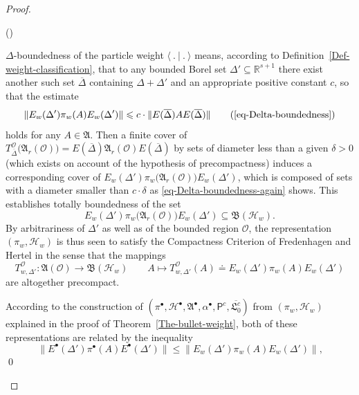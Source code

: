 \documentclass[11pt,twoside,openright]{report}
\theoremstyle{definition}
\theoremstyle{plain}
\theoremstyle{remark}
\theoremstyle{assumption}
\newcommand{\norm}[1]{\lVert #1 \rVert}
\newcommand{\scp}[2]{\langle #1 \vert #2 \rangle}
\newcommand{\Afrak}{\mathfrak{A}}
\newcommand{\Hscr}{\mathscr{H}}
\newcommand{\Oscr}{\mathscr{O}}
\newcommand{\Rsone}{\mathbb{R}^{s + 1}}
\newcommand{\Deltabar}{\overline{\Delta}}
\newcommand{\BHw}{\mathfrak{B} ( \mathscr{H}_w )}
\newcommand{\EDbar}{E ( \overline{\Delta} )}
\newcommand{\EbulletDeltaprime}{E^\bullet ( \Delta' )}
\newcommand{\EwDprime}{E_w ( \Delta' )}
\newcommand{\AO}{\mathfrak{A} ( \mathscr{O} )}
\newcommand{\ArO}{\mathfrak{A}_r ( \mathscr{O} )}
\newcommand{\Pcount}{\mathsf{P}^c}
\newcommand{\vaccountbar}{\overline{\mathfrak{L}_0^c}}
\newcommand{\Hbullet}{\mathscr{H}^\bullet}
\newcommand{\Abullet}{\mathfrak{A}^\bullet}
\newcommand{\TODbar}{T_{\overline{\Delta}}^\Oscr}
\newcommand{\TwODprime}{T_{w , \Delta'}^\Oscr}
\newcounter{proofitem}
\newenvironment{prooflist}{\begin{list}{(\roman{proofitem})}%
  {\usecounter{proofitem} \setlength{\topsep}{0ex}%
   \setlength{\parsep}{0.2ex} \setlength{\itemsep}{0.4ex}%
   \setlength{\leftmargin}{0em} \setlength{\itemindent}{0.5em}%
   \setlength{\listparindent}{1em}}}{\qed \end{list}}
\begin{document}
\begin{proof}
  \begin{prooflist}
  \item $\Delta$-boundedness of the particle weight $\scp{~.~}{~.~}$
    means, according to Definition~\ref{Def-weight-classification},
    that to any bounded Borel set $\Delta' \subseteq \Rsone$ there
    exist another such set $\Deltabar$ containing $\Delta + \Delta'$
    and an appropriate positive constant $c$, so that the estimate
    \begin{equation}
      \label{eq-Delta-boundedness-again}
      \norm{\EwDprime \pi_w ( A ) \EwDprime} \leqslant c \cdot
      \norm{\EDbar A \EDbar} \tag{\ref{eq-Delta-boundedness}}
    \end{equation}
    holds for any $A \in \Afrak$. Then a finite cover of $\TODbar
    \bigl( \ArO \bigr) = \EDbar \ArO \EDbar$ by sets of diameter less
    than a given $\delta > 0$ (which exists on account of the
    hypothesis of precompactness) induces a corresponding cover of
    $\EwDprime \pi_w \bigl( \ArO \bigr) \EwDprime$, which is composed
    of sets with a diameter smaller than $c \cdot \delta$ as
    \eqref{eq-Delta-boundedness-again} shows. This establishes totally
    boundedness of the set
    \begin{equation*}
      \EwDprime \pi_w \bigl( \ArO \bigr) \EwDprime \subseteq \BHw
      \text{.}
    \end{equation*}
    By arbitrariness of $\Delta'$ as well as of the bounded region
    $\Oscr$, the representation $( \pi_w , \Hscr_w )$ is thus seen to
    satisfy the Compactness Criterion of Fredenhagen and Hertel in the
    sense that the mappings
    \begin{equation*}
      \TwODprime : \AO \rightarrow \BHw \qquad A \mapsto \TwODprime (
      A ) \doteq \EwDprime \pi_w ( A ) \EwDprime
    \end{equation*}
    are altogether precompact.
  \item According to the construction of $( \pi^\bullet , \Hbullet ,
    \Abullet , \alpha^\bullet , \Pcount , \vaccountbar)$ from $( \pi_w
    , \Hscr_w )$ explained in the proof of
    Theorem~\ref{The-bullet-weight}, both of these representations are
    related by the inequality
    \begin{subequations}
      \begin{equation}
        \label{eq-pibullet-piw-relation}
        \norm{\EbulletDeltaprime \pi^\bullet ( A ) \EbulletDeltaprime}
        \leqslant \norm{\EwDprime \pi_w ( A ) \EwDprime} \text{,}

\end{equation}
\end{subequations}
\end{prooflist}
\end{proof}
\end{document}
